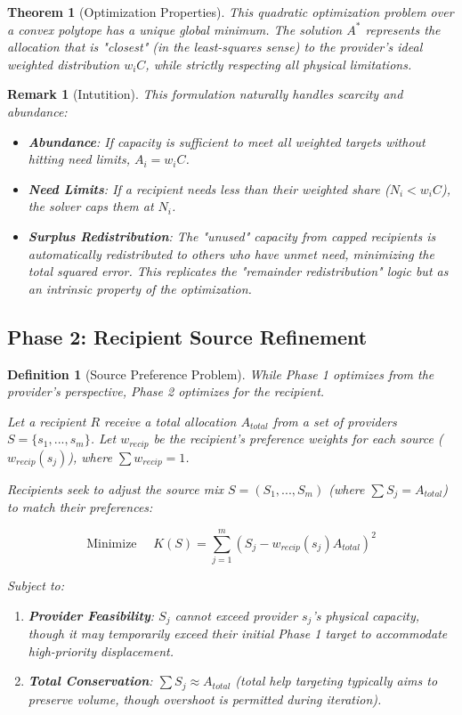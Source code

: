 \documentclass[11pt]{article}
\newtheorem{definition}{Definition}
\newtheorem{theorem}{Theorem}
\newtheorem{remark}{Remark}
\begin{document}
\begin{theorem}[Optimization Properties]
This quadratic optimization problem over a convex polytope has a unique global minimum. The solution $A^*$ represents the allocation that is "closest" (in the least-squares sense) to the provider's ideal weighted distribution $w_i C$, while strictly respecting all physical limitations.
\end{theorem}

\begin{remark}[Intutition]
This formulation naturally handles scarcity and abundance:
\begin{itemize}
   \item \textbf{Abundance}: If capacity is sufficient to meet all weighted targets without hitting need limits, $A_i = w_i C$.
   \item \textbf{Need Limits}: If a recipient needs less than their weighted share ($N_i < w_i C$), the solver caps them at $N_i$.
   \item \textbf{Surplus Redistribution}: The "unused" capacity from capped recipients is automatically redistributed to others who have unmet need, minimizing the total squared error. This replicates the "remainder redistribution" logic but as an intrinsic property of the optimization.
\end{itemize}
\end{remark}

\subsection{Phase 2: Recipient Source Refinement}

\begin{definition}[Source Preference Problem]
While Phase 1 optimizes from the provider's perspective, Phase 2 optimizes for the recipient.

Let a recipient $R$ receive a total allocation $A_{total}$ from a set of providers $S = \{s_1, ..., s_m\}$.
Let $w_{recip}$ be the recipient's preference weights for each source ($w_{recip}(s_j)$), where $\sum w_{recip} = 1$.

Recipients seek to adjust the source mix $S = (S_1, ..., S_m)$ (where $\sum S_j = A_{total}$) to match their preferences:

\[
\text{Minimize } \quad K(S) = \sum_{j=1}^m \left( S_j - w_{recip}(s_j) A_{total} \right)^2
\]

Subject to:
\begin{enumerate}
   \item \textbf{Provider Feasibility}: $S_j$ cannot exceed provider $s_j$'s physical capacity, though it may temporarily exceed their initial Phase 1 target to accommodate high-priority displacement.
   \item \textbf{Total Conservation}: $\sum S_j \approx A_{total}$ (total help targeting typically aims to preserve volume, though overshoot is permitted during iteration).
\end{enumerate}
\end{definition}
\end{document}
